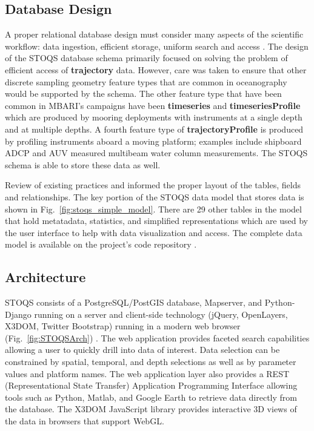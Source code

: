 \documentclass[conference]{IEEEtran}
\begin{document}
\subsection{Database Design}
A proper relational database design must consider many aspects of the scientific workflow: data ingestion, efficient storage, uniform search and access \cite{Bechini:2013:MSS:2425433.2425647}. The design of the STOQS database schema primarily focused on solving the problem of efficient access of \textbf{trajectory} data. However, care was taken to ensure that other discrete sampling geometry feature types \cite{DSG} that are common in oceanography would be supported by the schema.  The other feature type that have been common in MBARI's campaigns have been \textbf{timeseries} and \textbf{timeseriesProfile} which are produced by mooring deployments with instruments at a single depth and at multiple depths. 
A fourth feature type of \textbf{trajectoryProfile} is produced by profiling instruments aboard a moving platform; examples include shipboard ADCP and AUV measured multibeam water column measurements. The STOQS schema is able to store these data as well.

Review of existing practices \cite{Wright} and \cite{MODB} informed the proper layout of the tables, fields and relationships.  The key portion of the STOQS data model that stores data is shown in Fig.~\ref{fig:stoqs_simple_model}. There are 29 other tables in the model that hold metatadata, statistics, and simplified representations which are used by the user interface to help with data visualization and access. The complete data model is available on the project's code repository \cite{STOQS}. 



\subsection{Architecture}

STOQS consists of a PostgreSQL/PostGIS database, Mapserver, and Python-Django running on a server and client-side technology (jQuery, OpenLayers, X3DOM, Twitter Bootstrap) running in a modern web browser (Fig.~\ref{fig:STOQSArch}) . The web application provides faceted search capabilities allowing a user to quickly drill into data of interest. Data selection can be constrained by spatial, temporal, and depth selections as well as by parameter values and platform names. The web application layer also provides a REST (Representational State Transfer) Application Programming Interface allowing tools such as Python, Matlab, and Google Earth to retrieve data directly from the database. The X3DOM JavaScript library provides interactive 3D views of the data in browsers that support WebGL.
\end{document}
